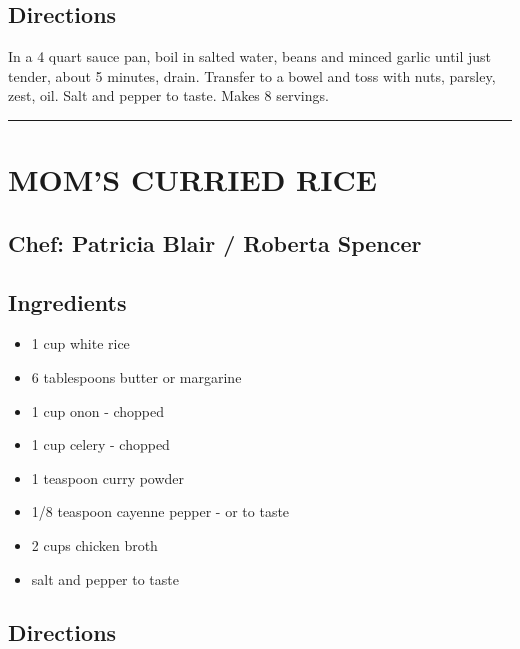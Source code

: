 \documentclass[
]{book}
\providecommand{\tightlist}{%
  \setlength{\itemsep}{0pt}\setlength{\parskip}{0pt}}
\begin{document}
\hypertarget{directions-32}{%
\subsection*{Directions}\label{directions-32}}


In a 4 quart sauce pan, boil in salted water, beans and minced garlic until just tender, about 5 minutes, drain.
Transfer to a bowel and toss with nuts, parsley, zest, oil. Salt and pepper to taste. Makes 8 servings.

\begin{center}\rule{0.5\linewidth}{0.5pt}\end{center}

\hypertarget{moms-curried-rice}{%
\section*{MOM'S CURRIED RICE}\label{moms-curried-rice}}


\hypertarget{chef-patricia-blair-roberta-spencer}{%
\subsection*{Chef: Patricia Blair / Roberta Spencer}\label{chef-patricia-blair-roberta-spencer}}


\hypertarget{ingredients-33}{%
\subsection*{Ingredients}\label{ingredients-33}}


\begin{itemize}
\tightlist
\item
  1 cup white rice
\item
  6 tablespoons butter or margarine
\item
  1 cup onon - chopped
\item
  1 cup celery - chopped
\item
  1 teaspoon curry powder
\item
  1/8 teaspoon cayenne pepper - or to taste
\item
  2 cups chicken broth
\item
  salt and pepper to taste
\end{itemize}

\hypertarget{directions-33}{%
\subsection*{Directions}\label{directions-33}}
\end{document}
